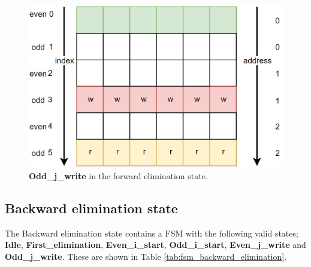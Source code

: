 \begin{figure}[H]
\centering
   \includegraphics[scale=0.3]{images/inverse_fsms/forward_elim/write_odd.PNG}
  \caption{\textbf{Odd\_j\_write} in the forward elimination state. } 
  \label{fig:forward_elim_odd_indexed_j}
\end{figure}











\subsection{Backward elimination state}
The Backward elimination state contains a FSM with the following valid states; \textbf{Idle}, \textbf{First\_elimination}, \textbf{Even\_i\_start}, \textbf{Odd\_i\_start}, \textbf{Even\_j\_write} and \textbf{Odd\_j\_write}. These are shown in Table \ref{tab:fsm_backward_elimination}.


